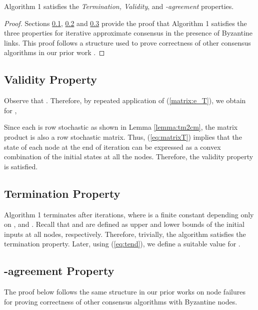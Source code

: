 \documentclass{llncs}
\newcommand{\fillbox}{\hspace*{\fill}}
\begin{document}
\begin{theorem}
\label{thm:correctness}
Algorithm 1 satisfies the {\em Termination, Validity}, and {\em -agreement} properties.
\end{theorem}

\begin{proof}
Sections \ref{s:validity}, \ref{s:termination} and \ref{s:agreement} provide the proof that Algorithm 1 satisfies the three properties for iterative approximate consensus in the presence of Byzantine links. This proof follows a structure used to prove correctness
of other consensus algorithms in our prior work \cite{Tseng_general,vaidya_icdcn14}.
\fillbox
\end{proof}


\subsection{Validity Property}
\label{s:validity}

Observe that . Therefore, by repeated application of (\ref{matrix:e_T}), we obtain for ,



Since each  is row stochastic as shown in Lemma \ref{lemma:tm2cm}, the matrix product  is also a row stochastic matrix. Thus, (\ref{eq:matrixT}) implies that the state of each node  at the end of iteration  can be expressed as a convex combination of the initial states at all the nodes. Therefore, the validity property is satisfied.

\subsection{Termination Property}
\label{s:termination}

Algorithm 1 terminates after  iterations, where  is a finite constant depending only on , and . Recall that  and  are defined as upper and lower bounds of the initial inputs at all nodes, respectively. Therefore, trivially, the algorithm satisfies the termination property. Later, using (\ref{eq:tend}), we define a suitable value for .


\subsection{-agreement Property}
\label{s:agreement}

The proof below follows the same structure in our prior works on node failures \cite{Tseng_general,vaidya_icdcn14} for proving correctness of other consensus algorithms with Byzantine nodes.
\end{document}

